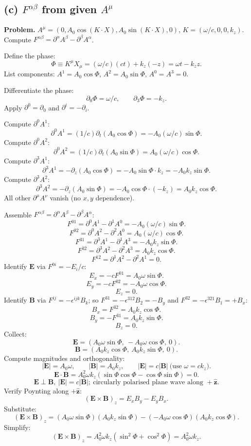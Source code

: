 \documentclass[11pt]{article}
\begin{document}
\subsection*{(c) $F^{\alpha\beta}$ from given $A^\mu$}

\textbf{Problem.} $A^\mu = (0,A_0\cos(K\!\cdot\!X), A_0\sin(K\!\cdot\!X),0)$, $K=(\omega/c,0,0,k_z)$. Compute $F^{\alpha\beta}=\partial^\alpha A^\beta-\partial^\beta A^\alpha$.

Define the phase:
\[ \Phi \equiv K^\mu X_\mu = (\omega/c)(ct) + k_z(-z) = \omega t - k_z z. \]
List components: $A^1=A_0\cos\Phi$, $A^2=A_0\sin\Phi$, $A^0=A^3=0$.

Differentiate the phase:
\[ \partial_0\Phi = \omega/c,\qquad \partial_3\Phi = -k_z. \]
Apply $\partial^0 = \partial_0$ and $\partial^i = -\partial_i$.

Compute $\partial^0 A^1$:
\[ \partial^0 A^1 = (1/c)\partial_t (A_0\cos\Phi) = -A_0(\omega/c)\sin\Phi. \]
Compute $\partial^0 A^2$:
\[ \partial^0 A^2 = (1/c)\partial_t (A_0\sin\Phi) = A_0(\omega/c)\cos\Phi. \]
Compute $\partial^3 A^1$:
\[ \partial^3 A^1 = -\partial_z(A_0\cos\Phi) = -A_0\sin\Phi\cdot k_z = -A_0 k_z\sin\Phi. \]
Compute $\partial^3 A^2$:
\[ \partial^3 A^2 = -\partial_z(A_0\sin\Phi) = -A_0\cos\Phi\cdot(-k_z) = A_0 k_z\cos\Phi. \]
All other $\partial^\mu A^\nu$ vanish (no $x,y$ dependence).

Assemble $F^{\alpha\beta} = \partial^\alpha A^\beta - \partial^\beta A^\alpha$:
\[ F^{01} = \partial^0 A^1 - \partial^1 A^0 = -A_0(\omega/c)\sin\Phi. \]
\[ F^{02} = \partial^0 A^2 - \partial^2 A^0 = A_0(\omega/c)\cos\Phi. \]
\[ F^{31} = \partial^3 A^1 - \partial^1 A^3 = -A_0 k_z\sin\Phi. \]
\[ F^{32} = \partial^3 A^2 - \partial^2 A^3 = A_0 k_z\cos\Phi. \]
\[ F^{12} = \partial^1 A^2 - \partial^2 A^1 = 0. \]
Identify $\bm E$ via $F^{0i} = -E_i/c$:
\[ E_x = -cF^{01} = A_0\omega\sin\Phi. \]
\[ E_y = -cF^{02} = -A_0\omega\cos\Phi. \]
\[ E_z = 0. \]
Identify $\bm B$ via $F^{ij} = -\epsilon^{ijk}B_k$; so $F^{31} = -\epsilon^{312}B_2 = -B_y$ and $F^{32} = -\epsilon^{321}B_1 = +B_x$:
\[ B_x = F^{32} = A_0 k_z\cos\Phi. \]
\[ B_y = -F^{31} = A_0 k_z\sin\Phi. \]
\[ B_z = 0. \]
Collect:
\[ \bm E = (A_0\omega\sin\Phi,\ -A_0\omega\cos\Phi,\ 0). \]
\[ \bm B = (A_0 k_z\cos\Phi,\ A_0 k_z\sin\Phi,\ 0). \]
Compute magnitudes and orthogonality:
\[ |\bm E|=A_0\omega,\qquad |\bm B|=A_0 k_z,\qquad |\bm E|=c|\bm B|\ \text{(use $\omega = ck_z$)}. \]
\[ \bm E\!\cdot\!\bm B = A_0^2\omega k_z(\sin\Phi\cos\Phi - \cos\Phi\sin\Phi) = 0. \]
\[ \boxed{\;\bm E\perp\bm B,\ |\bm E|=c|\bm B|;\ \text{circularly polarised plane wave along }+\hat{\bm z}.\;} \]
Verify Poynting along $+\hat{\bm z}$:
\[ (\bm E\times\bm B)_z = E_x B_y - E_y B_x. \]
Substitute:
\[ (\bm E\times\bm B)_z = (A_0\omega\sin\Phi)(A_0 k_z\sin\Phi) - (-A_0\omega\cos\Phi)(A_0 k_z\cos\Phi). \]
Simplify:
\[ (\bm E\times\bm B)_z = A_0^2\omega k_z(\sin^2\Phi + \cos^2\Phi) = A_0^2\omega k_z. \]
\end{document}
